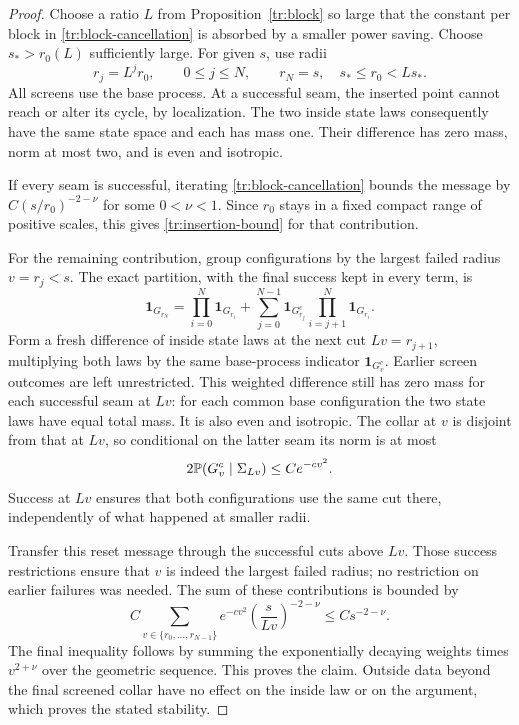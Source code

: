 \begin{proof}
Choose a ratio $L$ from Proposition~\ref{tr:block} so large that the
constant per block in \eqref{tr:block-cancellation} is absorbed by a
smaller power saving.  Choose $s_*>r_0(L)$ sufficiently large.  For
given $s$, use radii
\[
             r_j=L^j r_0,\qquad 0\le j\le N,
             \qquad r_N=s,\quad s_*\le r_0<Ls_*.
\]
All screens use the base process.  At a successful seam, the inserted
point cannot reach or alter its cycle, by localization.  The two
inside state laws consequently have the same state space and each
has mass one.  Their difference has zero mass, norm at most two,
and is even and isotropic.

If every seam is successful, iterating
\eqref{tr:block-cancellation} bounds the message by
$C(s/r_0)^{-2-\nu}$ for some $0<\nu<1$.  Since $r_0$ stays in a fixed
compact range of positive scales, this gives
\eqref{tr:insertion-bound} for that contribution.

For the remaining contribution, group configurations by the largest
failed radius $v=r_j<s$.  The exact partition, with the final success
kept in every term, is
\[
 \boldsymbol1_{G_{r_N}}
   =\prod_{i=0}^{N}\boldsymbol1_{G_{r_i}}
    +\sum_{j=0}^{N-1}\boldsymbol1_{G_{r_j}^c}
                      \prod_{i=j+1}^{N}\boldsymbol1_{G_{r_i}}.
\]
Form a fresh difference of inside state
laws at the next cut $Lv=r_{j+1}$, multiplying both laws by the same
base-process indicator $\boldsymbol1_{G_v^c}$.  Earlier screen
outcomes are left unrestricted.  This weighted difference still has
zero mass for each successful seam at $Lv$: for each common base
configuration the two state laws have equal total mass.  It is also
even and isotropic.  The collar at $v$ is disjoint from that at $Lv$,
so conditional on the latter seam its norm is at most
\begin{equation}
                2\mathbb P(G_v^c\mid\Sigma_{Lv})
                           \le C e^{-cv^2}.
\label{tr:reset}
\end{equation}
Success at $Lv$ ensures that both configurations use the same cut
there, independently of what happened at smaller radii.

Transfer this reset message through the successful cuts above $Lv$.
Those success restrictions ensure that $v$ is indeed the largest
failed radius; no restriction on earlier failures was needed.
The sum of these contributions is bounded by
\[
 C\sum_{v\in\{r_0,\ldots,r_{N-1}\}}
             e^{-cv^2}\left(\frac{s}{Lv}\right)^{-2-\nu}
       \le C s^{-2-\nu}.
\]
The final inequality follows by summing the exponentially decaying
weights times $v^{2+\nu}$ over the geometric sequence.  This proves
the claim.  Outside data beyond the final screened collar have no
effect on the inside law or on the argument, which proves the stated
stability.
\end{proof}

